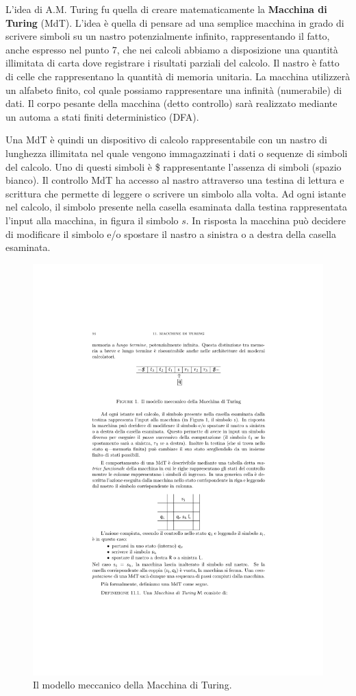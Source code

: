 \documentclass[a4paper]{article}
\begin{document}
	\noindent
	L'idea di A.M. Turing fu quella di creare matematicamente la \textcolor{Red3}{\textbf{Macchina di Turing}} (MdT). L'idea è quella di pensare ad una semplice macchina in grado di scrivere simboli su un nastro potenzialmente infinito, rappresentando il fatto, anche espresso nel punto 7, che nei calcoli abbiamo a disposizione una quantità illimitata di carta dove registrare i risultati parziali del calcolo.\newline
	Il nastro è fatto di celle che rappresentano la quantità di memoria unitaria. La macchina utilizzerà un alfabeto finito, col quale possiamo rappresentare una infinità (numerabile) di dati. Il corpo pesante della macchina (detto controllo) sarà realizzato mediante un automa a stati finiti deterministico (DFA).
	
	Una MdT è quindi un dispositivo di calcolo rappresentabile con un nastro di lunghezza illimitata nel quale vengono immagazzinati i dati o sequenze di simboli del calcolo. Uno di questi simboli è \$ rappresentante l'assenza di simboli (spazio bianco). Il controllo MdT ha accesso al nastro attraverso una testina di lettura e scrittura che permette di leggere o scrivere un simbolo alla volta.\newline
	Ad ogni istante nel calcolo, il simbolo presente nella casella esaminata dalla testina rappresentata l'input alla macchina, in figura il simbolo $s$. In risposta la macchina può decidere di modificare il simbolo e/o spostare il nastro a sinistra o a destra della casella esaminata.
	\begin{figure}[!htp]
		\centering
		\includegraphics[width=.6\textwidth]{img/MdT.pdf}
		\caption{Il modello meccanico della Macchina di Turing.}
	\end{figure}
\end{document}

